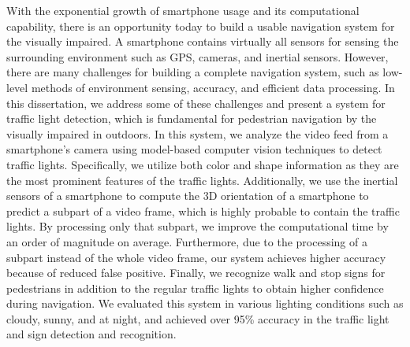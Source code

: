 \summary

With the exponential growth of smartphone usage and its computational capability, there is an opportunity today to build a usable navigation system for the visually impaired. 
A smartphone contains virtually all sensors for sensing the surrounding environment such as GPS, cameras, and inertial sensors. 
However, there are many challenges for building a complete navigation system, such as low-level methods of environment sensing, accuracy, and efficient data processing.
In this dissertation, we address some of these challenges and present a system for traffic light detection, which is fundamental for pedestrian navigation by the visually impaired in outdoors. 
In this system, we analyze the video feed from a smartphone's camera using model-based computer vision techniques to detect traffic lights. 
Specifically, we utilize both color and shape information as they are the most prominent features of the traffic lights.
Additionally, we use the inertial sensors of a smartphone to compute the 3D orientation of a smartphone to predict a subpart of a video frame, which is highly probable to contain the traffic lights. 
By processing only that subpart, we improve the computational time by an order of magnitude on average. 
Furthermore, due to the processing of a subpart instead of the whole video frame, our system achieves higher accuracy because of reduced false positive.
Finally, we recognize walk and stop signs for pedestrians in addition to the regular traffic lights to obtain higher confidence during navigation. 
We evaluated this system in various lighting conditions such as cloudy, sunny, and at night, and achieved over 95\% accuracy in the traffic light and sign detection and recognition.


